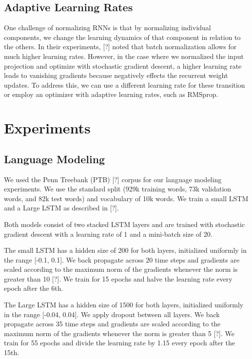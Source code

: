 \documentclass{article}
\begin{document}
\subsection{Adaptive Learning Rates} One challenge of normalizing RNNs is that by normalizing individual components, we change the learning dynamics of that component in relation to the others. In their experiments, [?] noted that batch normalization allows for much higher learning rates. However, in the case where we normalized the input projection and optimize with stochastic gradient descent, a higher learning rate leads to vanishing gradients because negatively effects the recurrent weight updates. To address this, we can use a different learning rate for these transition or employ an optimizer with adaptive learning rates, such as RMSprop.


\section{Experiments}

\subsection{Language Modeling}
We used the Penn Treebank (PTB) [?] corpus for our language modeling experiments. We use the standard split (929k training words, 73k validation words, and 82k test words) and vocabulary of 10k words. We train a small LSTM and a Large LSTM as described in [?].

Both models consist of two stacked LSTM layers and are trained with stochastic gradient descent with a learning rate of 1 and a mini-batch size of 20.

The small LSTM has a hidden size of 200 for both layers, initialized uniformly in the range [-0.1, 0.1]. We back propagate across 20 time steps and gradients are scaled according to the maximum norm of the gradients whenever the norm is greater than 10 [?]. We train for 15 epochs and halve the learning rate every epoch after the 6th.  

The Large LSTM has a hidden size of 1500 for both layers, initialized uniformly in the range [-0.04, 0.04]. We apply dropout between all layers. We back propagate across 35 time steps and gradients are scaled according to the maximum norm of the gradients whenever the norm is greater than 5 [?]. We train for 55 epochs and divide the learning rate by 1.15 every epoch after the 15th.
\end{document}
